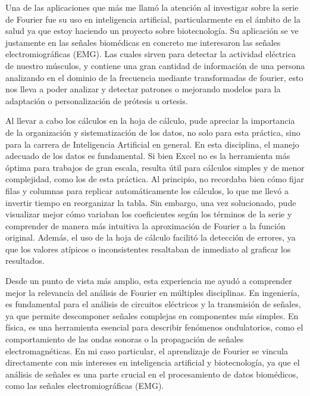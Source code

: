{Una de las aplicaciones que más me llamó la atención al investigar sobre la serie de Fourier fue su uso en inteligencia artificial, particularmente en el ámbito de la salud ya que estoy haciendo un proyecto sobre biotecnología. Su aplicación se ve justamente en las señales biomédicas en concreto me interesaron las señales electromiográficas (EMG). Las cuales sirven para detectar la actividad eléctrica de nuestro músculos, y contiene una gran cantidad de información de una persona analizando en el dominio de la frecuencia mediante transformadas de fourier, esto nos lleva a poder analizar y detectar patrones o mejorando modelos para la adaptación o personalización de prótesis u ortesis.

\newpage

Al llevar a cabo los cálculos en la hoja de cálculo, pude apreciar la importancia de la organización y sistematización de los datos, no solo para esta práctica, sino para la carrera de Inteligencia Artificial en general. En esta disciplina, el manejo adecuado de los datos es fundamental. Si bien Excel no es la herramienta más óptima para trabajos de gran escala, resulta útil para cálculos simples y de menor complejidad, como los de esta práctica. Al principio, no recordaba bien cómo fijar filas y columnas para replicar automáticamente los cálculos, lo que me llevó a invertir tiempo en reorganizar la tabla. Sin embargo, una vez solucionado, pude visualizar mejor cómo variaban los coeficientes según los términos de la serie y comprender de manera más intuitiva la aproximación de Fourier a la función original. Además, el uso de la hoja de cálculo facilitó la detección de errores, ya que los valores atípicos o inconsistentes resaltaban de inmediato al graficar los resultados.

Desde un punto de vista más amplio, esta experiencia me ayudó a comprender mejor la relevancia del análisis de Fourier en múltiples disciplinas. En ingeniería, es fundamental para el análisis de circuitos eléctricos y la transmisión de señales, ya que permite descomponer señales complejas en componentes más simples. En física, es una herramienta esencial para describir fenómenos ondulatorios, como el comportamiento de las ondas sonoras o la propagación de señales electromagnéticas. En mi caso particular, el aprendizaje de Fourier se vincula directamente con mis intereses en inteligencia artificial y biotecnología, ya que el análisis de señales es una parte crucial en el procesamiento de datos biomédicos, como las señales electromiográficas (EMG).

}
